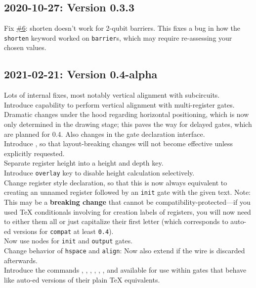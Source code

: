 \documentclass{scrartcl}
\makeatletter
\def\ttlink{\link\texttt}
\def\texlink{\link\tex}
\def\textlink{\link\@firstofone}
\makeatother
\begin{document}
      \subsection*{2020-10-27: Version 0.3.3}
         Fix \href{https://github.com/projekter/yquant/issues/6}{\#6}: shorten doesn't work for 2-qubit barriers. This fixes a bug in how the \texttt{shorten} keyword worked on \ttlink{barrier}s, which may require re\hyp assessing your chosen values.

      \subsection*{2021-02-21: Version 0.4-alpha}
         Lots of internal fixes, most notably vertical alignment with subcircuits. \\
         Introduce capability to perform vertical alignment with multi\hyp register gates. \\
         Dramatic changes under the hood regarding horizontal positioning, which is now only determined in the drawing stage; this paves the way for delayed gates, which are planned for 0.4.
         Also changes in the gate declaration interface. \\
         Introduce \textlink[compat]{compatibility layer}, so that layout\hyp breaking changes will not become effective unless explicitly requested. \\
         Separate register height into a height and depth key. \\
         Introduce \ttlink{overlay} key to disable height calculation selectively. \\
         Change register style declaration, so that this is now always equivalent to creating an unnamed register followed by an \ttlink{init} gate with the given text.
         Note: This may be a \textbf{breaking change} that cannot be compatibility\hyp protected---if you used \TeX{} conditionals involving \texlink{\idx} for creation labels of registers, you will now need to either \texlink{\protect} them all or just capitalize their first letter (which corresponds to auto\hyp\texlink\protect ed versions for \ttlink{compat} at least \texttt{0.4}). \\
         Now use nodes for \ttlink{init} and \ttlink{output} gates. \\
         Change behavior of \ttlink{hspace} and \ttlink{align}: Now also extend if the wire is discarded afterwards. \\
         Introduce the commands \texlink\Ifnum, \texlink\Ifcase, \texlink\Or, \texlink\Else, \texlink\Fi, \texlink\Unless, and \texlink{\The} available for use within gates that behave like auto\hyp\texlink\protect ed versions of their plain \TeX{} equivalents.
\end{document}
